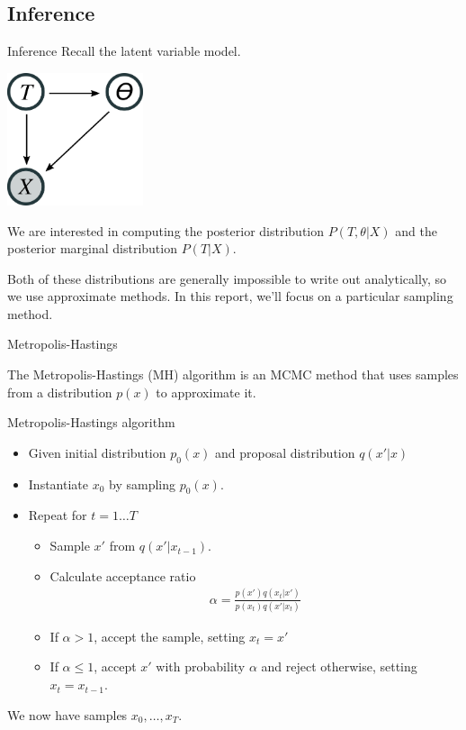 \documentclass[10pt, compress]{beamer}
\begin{document}
\subsection{Inference}
\begin{frame}{Inference}
  Recall the latent variable model.
  \begin{center}
    \includegraphics[width=0.3\textwidth]{img/bhc-lvm}
  \end{center}
  \pause

  We are interested in computing the posterior distribution
  $P(T, \theta | X)$ and the posterior marginal distribution
  $P(T | X)$.

  \pause

  Both of these distributions are generally impossible
  to write out analytically, so we use approximate methods.
  In this report, we'll focus on a particular sampling method.
\end{frame}

\begin{frame}{Metropolis-Hastings}
  
  The \alert{Metropolis-Hastings} (MH) algorithm
  is an MCMC method that uses
  samples from a distribution $p(x)$ to approximate it.

  \pause
  \begin{block}{Metropolis-Hastings algorithm}
  \begin{itemize}
    \item Given initial distribution $p_0(x)$ and proposal distribution
      $q(x'|x)$
    \item Instantiate $x_0$ by sampling $p_0(x)$.
      \pause
    \item Repeat for $t = 1 \ldots T$
      \pause
      \begin{itemize}
        \item Sample $x'$ from $q(x'|x_{t - 1})$.
      \pause
        \item Calculate acceptance ratio
          \begin{align}
              \alpha = \frac{p(x')q(x_t | x')}{p(x_t)q(x' | x_t)}
          \end{align}
      \pause
        \item If $\alpha > 1$, accept the sample, setting $x_t = x'$
      \pause
        \item If $\alpha \le 1$, accept $x'$ with probability $\alpha$
          and reject otherwise, setting $x_t = x_{t - 1}$.
      \end{itemize}
  \end{itemize}
\end{block}
  \pause
  We now have samples $x_0, \ldots, x_T$.
\end{frame}
\end{document}
